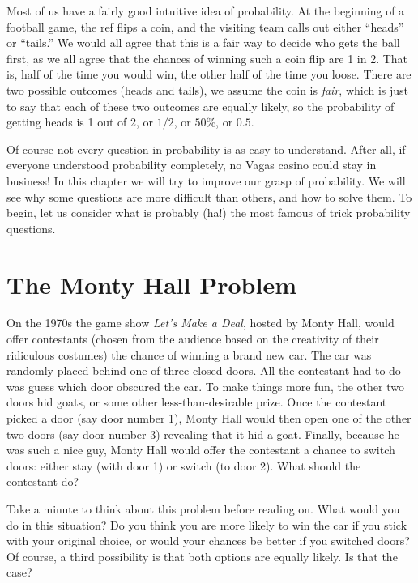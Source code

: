 
Most of us have a fairly good intuitive idea of probability.  At the beginning of a football game, the ref flips a coin, and the visiting team calls out either ``heads'' or ``tails.''  We would all agree that this is a fair way to decide who gets the ball first, as we all agree that the chances of winning such a coin flip are 1 in 2.  That is, half of the time you would win, the other half of the time you loose.  There are two possible outcomes (heads and tails), we assume the coin is {\em fair}, which is just to say that each of these two outcomes are equally likely, so the probability of getting heads is 1 out of 2, or $1/2$, or $50\%$, or $0.5$. 

Of course not every question in probability is as easy to understand.  After all, if everyone understood probability completely, no Vagas casino could stay in business!  In this chapter we will try to improve our grasp of probability.  We will see why some questions are more difficult than others, and how to solve them.  To begin, let us consider what is probably (ha!) the most famous of trick probability questions.

\section{The Monty Hall Problem}

On the 1970s the game show {\em Let's Make a Deal}, hosted by Monty Hall, would offer contestants (chosen from the audience based on the creativity of their ridiculous costumes) the chance of winning a brand new car.  The car was randomly placed behind one of three closed doors.  All the contestant had to do was guess which door obscured the car.  To make things more fun, the other two doors hid goats, or some other less-than-desirable prize.  Once the contestant picked a door (say door number 1), Monty Hall would then open one of the other two doors (say door number 3) revealing that it hid a goat.  Finally, because he was such a nice guy, Monty Hall would offer the contestant a chance to switch doors: either stay (with door 1) or switch (to door 2).  What should the contestant do?

Take a minute to think about this problem before reading on.  What would you do in this situation?  Do you think you are more likely to win the car if you stick with your original choice, or would your chances be better if you switched doors?  Of course, a third possibility is that both options are equally likely.  Is that the case?

